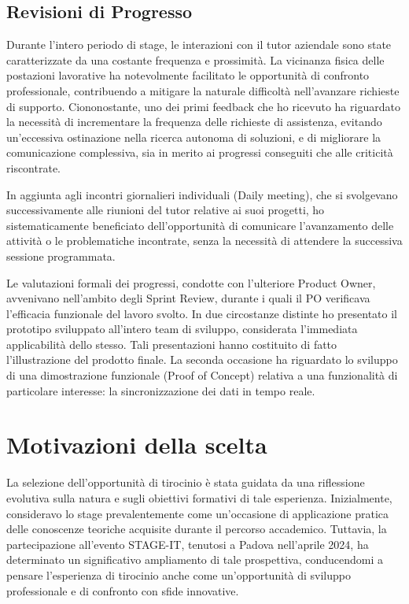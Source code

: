         \subsection{Revisioni di Progresso}

        Durante l'intero periodo di stage, le interazioni con il tutor aziendale sono state caratterizzate da una costante frequenza e prossimità. La vicinanza fisica delle postazioni lavorative ha notevolmente facilitato le opportunità di confronto professionale, contribuendo a mitigare la naturale difficoltà nell'avanzare richieste di supporto. Ciononostante, uno dei primi feedback che ho ricevuto ha riguardato la necessità di incrementare la frequenza delle richieste di assistenza, evitando un'eccessiva ostinazione nella ricerca autonoma di soluzioni, e di migliorare la comunicazione complessiva, sia in merito ai progressi conseguiti che alle criticità riscontrate.

        In aggiunta agli incontri giornalieri individuali (Daily meeting), che si svolgevano successivamente alle riunioni del tutor relative ai suoi progetti, ho sistematicamente beneficiato dell'opportunità di comunicare l'avanzamento delle attività o le problematiche incontrate, senza la necessità di attendere la successiva sessione programmata.

        Le valutazioni formali dei progressi, condotte con l'ulteriore Product Owner, avvenivano nell'ambito degli Sprint Review, durante i quali il PO verificava l'efficacia funzionale del lavoro svolto. In due circostanze distinte ho presentato il prototipo sviluppato all'intero team di sviluppo, considerata l'immediata applicabilità dello stesso. Tali presentazioni hanno costituito di fatto l'illustrazione del prodotto finale. La seconda occasione ha riguardato lo sviluppo di una dimostrazione funzionale (Proof of Concept) relativa a una funzionalità di particolare interesse: la sincronizzazione dei dati in tempo reale.
        
    \section{Motivazioni della scelta}
    La selezione dell'opportunità di tirocinio è stata guidata da una riflessione evolutiva sulla natura e sugli obiettivi formativi di tale esperienza. Inizialmente, consideravo lo stage prevalentemente come un'occasione di applicazione pratica delle conoscenze teoriche acquisite durante il percorso accademico. Tuttavia, la partecipazione all'evento STAGE-IT, tenutosi a Padova nell'aprile 2024, ha determinato un significativo ampliamento di tale prospettiva, conducendomi a pensare l'esperienza di tirocinio anche come un'opportunità di sviluppo professionale e di confronto con sfide innovative.

